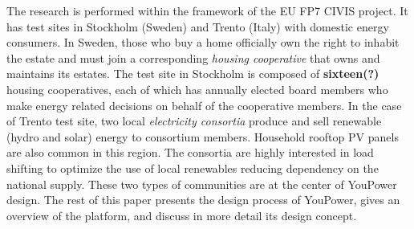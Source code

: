The research is performed within the framework of the EU FP7 CIVIS project. It has test sites in Stockholm (Sweden) and Trento (Italy) with domestic energy consumers. 
% 
In Sweden, those who buy a home officially own the right to inhabit the estate and must join a corresponding \textit{housing cooperative} 
that owns and maintains its estates. The test site in Stockholm is composed of \textbf{sixteen(?)} housing cooperatives, each of which has annually elected board members who make energy related decisions on behalf of the cooperative members. 
In the case of Trento test site, two local \textit{electricity consortia} produce and sell renewable (hydro and solar) energy to consortium members. Household rooftop PV panels are also common in this region.  The consortia are highly interested in load shifting to optimize the use of local renewables reducing dependency on the national supply. 
These two types of communities are at the center of YouPower design. 
% 
The rest of this paper presents the design process of YouPower, gives an overview of the platform, and discuss in more detail its design concept.

